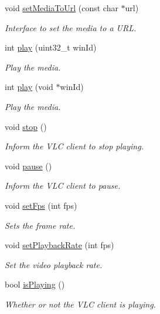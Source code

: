 \begin{DoxyCompactItemize}
void \hyperlink{classVLCToQtInterface_a782ba1a8e8d174bd0fabc4d292b6e40e}{set\-Media\-To\-Url} (const char $\ast$url)
\begin{DoxyCompactList}\small\item\em Interface to set the media to a U\-R\-L. \end{DoxyCompactList}\item 
int \hyperlink{classVLCToQtInterface_ac6b8b81ce5f399604b29492654d9f4ca}{play} (uint32\-\_\-t win\-Id)
\begin{DoxyCompactList}\small\item\em Play the media. \end{DoxyCompactList}\item 
int \hyperlink{classVLCToQtInterface_a31f1552dd75dafa174a7b6c4f5d7859f}{play} (void $\ast$win\-Id)
\begin{DoxyCompactList}\small\item\em Play the media. \end{DoxyCompactList}\item 
void \hyperlink{classVLCToQtInterface_a59428645eef3ef14c957a35f5f71a14e}{stop} ()
\begin{DoxyCompactList}\small\item\em Inform the V\-L\-C client to stop playing. \end{DoxyCompactList}\item 
void \hyperlink{classVLCToQtInterface_a69c5cf8921c45d50d0e679447af3c12e}{pause} ()
\begin{DoxyCompactList}\small\item\em Inform the V\-L\-C client to pause. \end{DoxyCompactList}\item 
void \hyperlink{classVLCToQtInterface_a1193d87a92a558d51efc62e6f5639f0a}{set\-Fps} (int fps)
\begin{DoxyCompactList}\small\item\em Sets the frame rate. \end{DoxyCompactList}\item 
void \hyperlink{classVLCToQtInterface_a7928cd122995dd11f7128a768de6015c}{set\-Playback\-Rate} (int fps)
\begin{DoxyCompactList}\small\item\em Set the video playback rate. \end{DoxyCompactList}\item 
bool \hyperlink{classVLCToQtInterface_a10bc62d5d355788f700c7f45ba0713e8}{is\-Playing} ()
\begin{DoxyCompactList}\small\item\em Whether or not the V\-L\-C client is playing. \end{DoxyCompactList}\item 

\end{DoxyCompactItemize}
